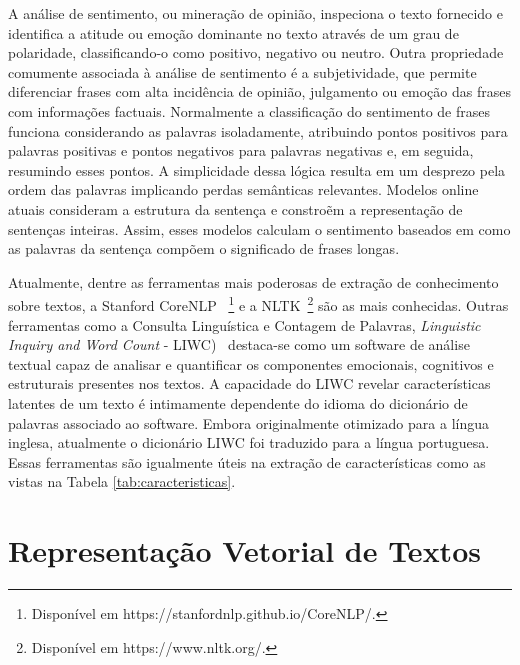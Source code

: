 \documentclass{SBCbookchapter}
\begin{document}
A análise de sentimento, ou mineração de opinião, inspeciona o texto fornecido e identifica a atitude ou emoção dominante no texto através de um grau de polaridade, classificando-o como positivo, negativo ou neutro. Outra propriedade comumente associada à análise de sentimento é a subjetividade, que permite diferenciar frases com alta incidência de opinião, julgamento ou emoção das frases com informações factuais. Normalmente a classificação do sentimento de frases funciona considerando as palavras isoladamente, atribuindo pontos positivos para palavras positivas e pontos negativos para palavras negativas e, em seguida, resumindo esses pontos. A simplicidade dessa lógica resulta em um desprezo pela ordem das palavras implicando perdas semânticas relevantes\cite{socher2013recursive}.
Modelos online atuais consideram a estrutura da sentença e constro\~em a representação de sentenças inteiras. Assim, esses modelos calculam o sentimento baseados em como as palavras da sentença compõem o significado de frases longas. 

Atualmente, dentre as ferramentas mais poderosas de extração de conhecimento sobre textos, a Stanford CoreNLP~ \footnote{Disponível em https://stanfordnlp.github.io/CoreNLP/.} e a NLTK~\footnote{Disponível em https://www.nltk.org/.} são as mais conhecidas.
Outras ferramentas como a Consulta Linguística e Contagem de Palavras, \textit{Linguistic Inquiry and Word Count} - LIWC)~\cite{pennebaker2001linguistic} destaca-se como um software de análise textual capaz de analisar e quantificar os componentes emocionais, cognitivos e estruturais presentes nos textos. A capacidade do LIWC revelar características latentes de um texto é intimamente dependente do idioma do dicionário de palavras associado ao software. Embora originalmente otimizado para a língua inglesa, atualmente o dicionário LIWC foi traduzido para a língua portuguesa\cite{balage2013evaluation}. Essas ferramentas são igualmente úteis na extração de características como as vistas na Tabela \ref{tab:caracteristicas}. 



\section {Representação Vetorial de Textos}
\label{sec:vetorização}
\end{document}
